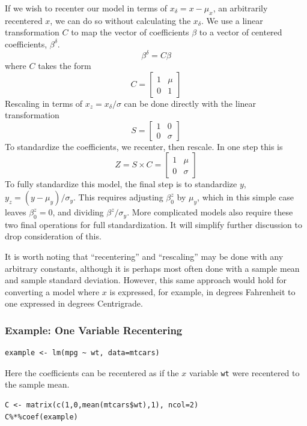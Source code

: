 \documentclass[]{article}
\begin{document}
If we wish to recenter our model in terms of \(x_\delta=x-\mu_x\), an
arbitrarily recentered \(x\), we can do so without calculating the
\(x_\delta\). We use a linear transformation \(C\) to map the vector of
coefficients \(\beta\) to a vector of centered coefficients,
\(\beta^\delta\). \[\beta^\delta=C\beta\] where \(C\) takes the form
\[C=\begin{bmatrix}1 & \mu \\ 0 & 1 \end{bmatrix}\] Rescaling in terms
of \(x_z=x_\delta/\sigma\) can be done directly with the linear
transformation \[S=\begin{bmatrix}1 & 0 \\ 0 & \sigma \end{bmatrix}\] To
standardize the coefficients, we recenter, then rescale. In one step
this is
\[Z = S \times C =\begin{bmatrix}1 & \mu \\ 0 & \sigma \end{bmatrix}\]
To fully standardize this model, the final step is to standardize \(y\),
\(y_z=(y-\mu_y)/\sigma_y\). This requires adjusting \(\beta_0^z\) by
\(\mu_y\), which in this simple case leaves \(\beta_0^z=0\), and
dividing \(\beta^z/\sigma_y\). More complicated models also require
these two final operations for full standardization. It will simplify
further discussion to drop consideration of this.

It is worth noting that ``recentering'' and ``rescaling'' may be done
with any arbitrary constants, although it is perhaps most often done
with a sample mean and sample standard deviation. However, this same
approach would hold for converting a model where \(x\) is expressed, for
example, in degrees Fahrenheit to one expressed in degrees Centrigrade.

\hypertarget{example-one-variable-recentering}{%
\subsubsection{Example: One Variable
Recentering}\label{example-one-variable-recentering}}

\begin{verbatim}
example <- lm(mpg ~ wt, data=mtcars)
\end{verbatim}

Here the coefficients can be recentered as if the \(x\) variable
\texttt{wt} were recentered to the sample mean.

\begin{verbatim}
C <- matrix(c(1,0,mean(mtcars$wt),1), ncol=2)
C%*%coef(example)
\end{verbatim}
\end{document}
